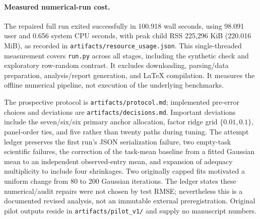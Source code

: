 \documentclass{article}
\begin{document}
\paragraph{Measured numerical-run cost.} The repaired full run exited successfully in 100.918 wall seconds, using 98.091 user and 0.656 system CPU seconds, with peak child RSS 225,296 KiB (220.016 MiB), as recorded in \texttt{artifacts/resource\_usage.json}. This single-threaded measurement covers \texttt{run.py} across all stages, including the synthetic check and exploratory row-random contrast. It excludes downloading, parsing/data preparation, analysis/report generation, and LaTeX compilation. It measures the offline numerical pipeline, not execution of the underlying benchmarks.

The prospective protocol is \texttt{artifacts/protocol.md}; implemented pre-error choices and deviations are \texttt{artifacts/decisions.md}. Important deviations include the seven/six/six primary anchor allocation, factor ridge grid $\{0.01,0.1\}$, panel-order ties, and five rather than twenty paths during tuning. The attempt ledger preserves the first run's JSON serialization failure, two empty-task scientific failures, the correction of the task-mean baseline from a fitted Gaussian mean to an independent observed-entry mean, and expansion of adequacy multiplicity to include four shrinkages. Two originally capped fits motivated a uniform change from 80 to 200 Gaussian iterations. The ledger states these numerical/audit repairs were not chosen by test RMSE; nevertheless this is a documented revised analysis, not an immutable external preregistration. Original pilot outputs reside in \texttt{artifacts/pilot\_v1/} and supply no manuscript numbers.
\end{document}
